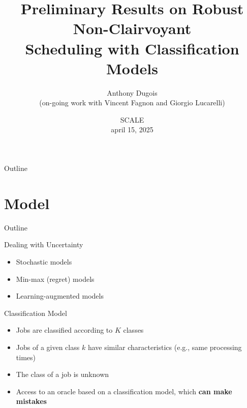 \documentclass[aspectratio=169]{beamer}
\title{Preliminary Results on Robust Non-Clairvoyant\\Scheduling with Classification Models}
\author{Anthony Dugois\\\footnotesize (on-going work with Vincent Fagnon and Giorgio Lucarelli)}
\institute{Université Marie et Louis Pasteur, institut FEMTO-ST, Besançon}
\date{SCALE\\\footnotesize april 15, 2025}
\begin{document}
\frame{\titlepage}

\begin{frame}{Outline}
    \tableofcontents[hideallsubsections]
\end{frame}


\section{Model}

\begin{frame}{Outline}
\end{frame}


\begin{frame}{Dealing with Uncertainty}

\begin{itemize}
    \item Stochastic models%
    \item Min-max (regret) models%
    \item Learning-augmented models%
\end{itemize}

\end{frame}


\begin{frame}{Classification Model}

\begin{itemize}
    \item Jobs are classified according to \(K\) classes
    \item Jobs of a given class \(k\) have similar characteristics (e.g., same processing times)
    \item The class of a job is unknown
    \item Access to an oracle based on a classification model, which \textbf{can make mistakes}
\end{itemize}

\end{frame}
\end{document}
